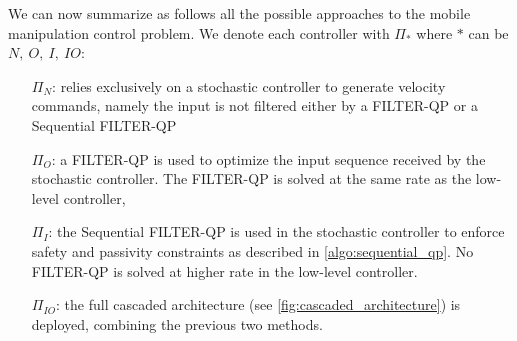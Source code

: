 We can now summarize as follows all the possible approaches to the mobile manipulation control problem. We denote each controller with $\Pi_{*}$ where $*$ can be $N,\ O,\ I,\ IO$:
\begin{itemize}
    \item[$\Pi_{N}$:] relies exclusively on a stochastic controller to generate velocity commands, namely the input is not filtered either by a FILTER-QP or a Sequential FILTER-QP
    \item[$\Pi_{O}$:] a FILTER-QP is used to optimize the input sequence received by the stochastic controller. The FILTER-QP is solved at the same rate as the low-level controller,
    \item[$\Pi_{I}$:] the Sequential FILTER-QP is used in the stochastic controller to enforce safety and passivity constraints  as described in \algo \ref{algo:sequential_qp}. No FILTER-QP is solved at higher rate in the low-level controller.
    \item[$\Pi_{IO}$:] the full cascaded architecture (see \fig \ref{fig:cascaded_architecture}) is deployed, combining the previous two methods.
\end{itemize}
